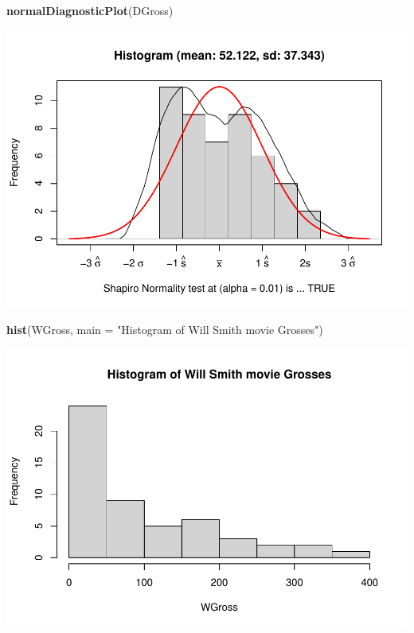 \documentclass[]{article}
\newenvironment{Shaded}{\begin{snugshade}}{\end{snugshade}}
\newcommand{\DataTypeTok}[1]{\textcolor[rgb]{0.13,0.29,0.53}{#1}}
\newcommand{\KeywordTok}[1]{\textcolor[rgb]{0.13,0.29,0.53}{\textbf{#1}}}
\newcommand{\NormalTok}[1]{#1}
\newcommand{\StringTok}[1]{\textcolor[rgb]{0.31,0.60,0.02}{#1}}
\begin{document}
\begin{Shaded}
\begin{Highlighting}[]
\KeywordTok{normalDiagnosticPlot}\NormalTok{(DGross)}
\end{Highlighting}
\end{Shaded}

\includegraphics{Denzel-v-Will-data_files/figure-latex/unnamed-chunk-5-2.pdf}

\begin{Shaded}
\begin{Highlighting}[]
\KeywordTok{hist}\NormalTok{(WGross, }\DataTypeTok{main =} \StringTok{"Histogram of Will Smith movie Grosses"}\NormalTok{)}
\end{Highlighting}
\end{Shaded}

\includegraphics{Denzel-v-Will-data_files/figure-latex/unnamed-chunk-5-3.pdf}
\end{document}
